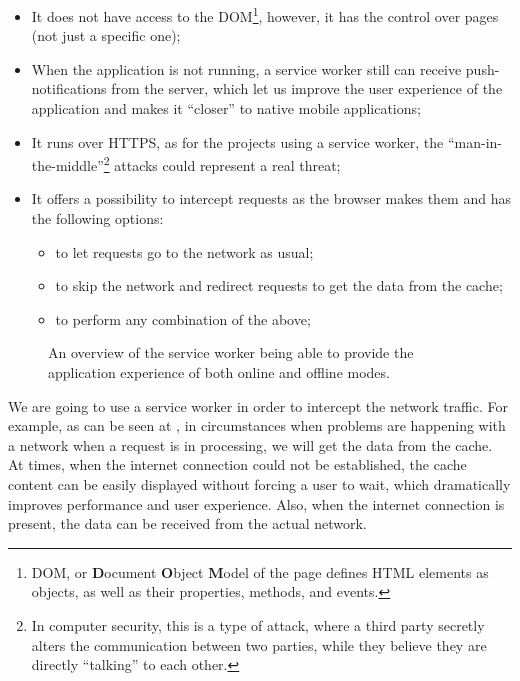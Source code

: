 \begin{itemize}
\item{It does not have access to the DOM\footnote{DOM, or \textbf{D}ocument \textbf{O}bject \textbf{M}odel of the page defines HTML elements as objects, as well as their properties, methods, and events.}, however, it has the control over pages (not just a specific one);}
\item{When the application is not running, a service worker still can receive push-notifications from the server\cite{32}, which let us improve the user experience of the application and makes it ``closer'' to native mobile applications;}

\item{It runs over HTTPS, as for the projects using a service worker, the ``man-in-the-middle''\footnote{In computer security, this is a type of attack, where a third party secretly alters the communication between two parties, while they believe they are directly ``talking'' to each other\cite{33}.} attacks could represent a real threat;}
\item{It offers a possibility to intercept requests as the browser makes them and has the following options:}
\begin{itemize}
\item{to let requests go to the network as usual;}
\item{to skip the network and redirect requests to get the data from the cache;}
\item{to perform any combination of the above;}
\end{itemize}
\end{itemize}

\begin{figure}[!htb]
    \begin{center}
    \def\svgwidth{0.7\linewidth}
    
    \caption {An overview of the service worker being able to provide the application experience of both online and offline modes.}
    \label{fig:sw_interact}
\end{center}
\end{figure}

We are going to use a service worker in order to intercept the network traffic. For example, as can be seen at , in circumstances when problems are happening with a network when a request is in processing, we will get the data from the cache. At times, when the internet connection could not be established, the cache content can be easily displayed without forcing a user to wait, which dramatically improves performance and user experience. Also, when the internet connection is present, the data can be received from the actual network. 

